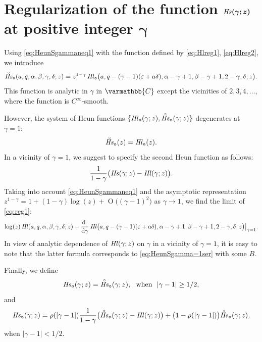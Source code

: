 \documentclass[11pt]{article}
\newcommand{\MF}[1]{\mathop{\mbox{$#1$}}\nolimits}
\newcommand{\Cb}{\varmathbb{C}}%
\def\HeunL{\MF{\textit{Hl\/}}}%
\def\HeunS{\MF{\textit{Hs\/}}}%
\def\regsgn{\scalebox{0.5}{\bf\sun}}
\begin{document}
\section{Regularization of the function $\bm{\HeunS(\gamma;z)}$ at positive integer $\bm\gamma$}

Using \eqref{eq:HeunSgammaneq1} with the function defined by \eqref{eq:Hlreg1}, \eqref{eq:Hlreg2}, we introduce
\begin{equation*}
\accentset{\circ}{\HeunS}_{\regsgn}(a,q,\alpha,\beta,\gamma,\delta;z) = z^{1-\gamma}\HeunL_{\regsgn}\bigl(a,q-(\gamma-1)(\varepsilon+a\delta),
 \alpha-\gamma+1,\beta-\gamma+1,2-\gamma,\delta;z\bigr).
\end{equation*}
This function is analytic in $\gamma$ in $\Cb$ except the vicinities of $2,3,4,\ldots$, where the function is $C^\infty$-smooth.

However, the system of Heun functions $\{\HeunL_{\regsgn}(\gamma;z), \accentset{\circ}{\HeunS}_{\regsgn}(\gamma;z)\}$ degenerates at $\gamma=1$:
$$\accentset{\circ}{\HeunS}_{\regsgn}(z) =\HeunL_{\regsgn}(z).$$
In a vicinity of $\gamma=1$, we suggest to specify the second Heun function as follows:
\begin{equation}
\frac{1}{1-\gamma}\bigl(\HeunS(\gamma;z)-\HeunL(\gamma;z)\bigr).
\label{eq:reg1}
\end{equation}
Taking into account \eqref{eq:HeunSgammaneq1} and the asymptotic representation $z^{1-\gamma}=1+(1-\gamma)\log(z)+\MF{O}\bigl((\gamma - 1)^2\bigr)$ as $\gamma\to1$, we find the limit of \eqref{eq:reg1}:
\begin{equation*}
\log(z)\HeunL(a,q,\alpha,\beta,\gamma,\delta;z) -
\frac{\textrm{d}~}{\textrm{d}\gamma}\HeunL\bigl(a,q-(\gamma-1)(\varepsilon+a\delta),
 \alpha-\gamma+1,\beta-\gamma+1,2-\gamma,\delta;z\bigr)\bigr|_{\gamma=1}.
\end{equation*}
In view of analytic dependence of $\HeunL(\gamma;z)$ on $\gamma$ in a vicinity of $\gamma=1$, it is easy to note that the latter formula corresponds to \eqref{eq:HeunSgamma=1ser} with some $B$.

Finally, we define
\begin{equation*}
\HeunS_{\regsgn}(\gamma;z)=
\accentset{\circ}{\HeunS}_{\regsgn}(\gamma;z),\ \ \mbox{when}\ \ |\gamma-1|\geq1/2,
\label{eq:HeunSgamma1reg1}
\end{equation*}
 and
\begin{equation}
\HeunS_{\regsgn}(\gamma;z)=
\rho(|\gamma-1|)\frac{1}{1-\gamma}\bigl(\accentset{\circ}{\HeunS}_{\regsgn}(\gamma;z)-\HeunL(\gamma;z)\bigr)
+\bigl(1-\rho(|\gamma-1|)\bigr)\accentset{\circ}{\HeunS}_{\regsgn}(\gamma;z),
\label{eq:HeunSgamma1reg2}
\end{equation}
when $ |\gamma-1|<1/2$.
\end{document}
